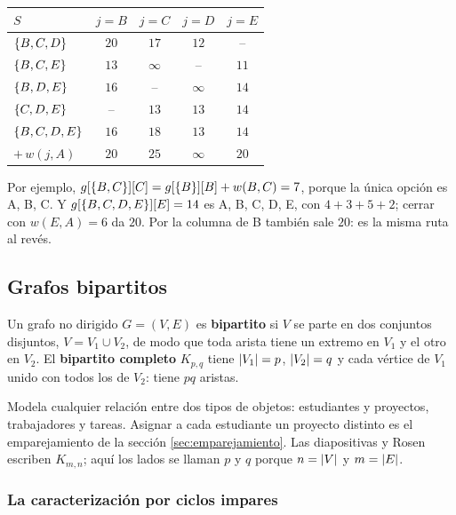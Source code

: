 \documentclass[11pt,letterpaper]{article}
\begin{document}
\begin{ejemplo}
\begin{center}
  \qquad
  \begin{tabular}[t]{lcccc}
    \toprule
    $S$ & $j = B$ & $j = C$ & $j = D$ & $j = E$ \\
    \midrule
    $\left\{ B, C, D \right\}$ & $20$ & $17$ & $12$ & -- \\
    $\left\{ B, C, E \right\}$ & $13$ & $\infty$ & -- & $11$ \\
    $\left\{ B, D, E \right\}$ & $16$ & -- & $\infty$ & $14$ \\
    $\left\{ C, D, E \right\}$ & -- & $13$ & $13$ & $14$ \\
    \addlinespace
    $\left\{ B, C, D, E \right\}$ & $16$ & $18$ & $13$ & $14$ \\
    \midrule
    $+\,w(j, A)$ & $20$ & $25$ & $\infty$ & $20$ \\
    \bottomrule
  \end{tabular}
  \end{center}
  Por ejemplo, $g[\left\{ B, C \right\}][C] = g[\left\{ B \right\}][B] + w(B, C) = 7$,
  porque la única opción es A, B, C. Y $g[\left\{ B, C, D, E \right\}][E] = 14$
  es A, B, C, D, E, con $4 + 3 + 5 + 2$; cerrar con $w(E, A) = 6$ da
  $20$. Por la columna de B también sale $20$: es la misma ruta al
  revés.
\end{ejemplo}


\subsection*{Grafos bipartitos}

\begin{definicion}
  \label{def:bipartito}
  Un grafo no dirigido $G = (V, E)$ es \textbf{bipartito} si $V$ se
  parte en dos conjuntos disjuntos, $V = V_1 \cup V_2$, de modo que
  toda arista tiene un extremo en $V_1$ y el otro en $V_2$. El
  \textbf{bipartito completo} $K_{p,q}$ tiene $\left\lvert V_1 \right\rvert = p$,
  $\left\lvert V_2 \right\rvert = q$ y cada vértice de $V_1$ unido con todos los de
  $V_2$: tiene $pq$ aristas.
\end{definicion}

Modela cualquier relación entre dos tipos de objetos: estudiantes y
proyectos, trabajadores y tareas. Asignar a cada estudiante un
proyecto distinto es el emparejamiento de la sección
\ref{sec:emparejamiento}. Las diapositivas y Rosen escriben
$K_{m,n}$; aquí los lados se llaman $p$ y $q$ porque $n = \left\lvert V \right\rvert$ y
$m = \left\lvert E \right\rvert$.

\subsubsection*{La caracterización por ciclos impares}
\end{document}
